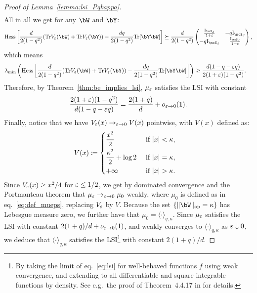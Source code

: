 \begin{proof}[Proof of Lemma~\ref{lemma:lsi_Pqkappa}]
\begin{align*}
    \end{align*}
    All in all we get for any $\bW$ and $\bY$:
    \begin{align*}
       \Hess \left[\frac{d}{2(1-q^2)} (\Tr V_\eps(\bW) + \Tr V_\eps(\bY)) - \frac{dq}{2(1-q^2)} \Tr[\bY \bW]\right]  
       \succeq \frac{d}{2(1-q^2)} 
       \begin{pmatrix}
         \frac{\Id_{\mcS_d}}{1+\eps} & - q \Id_{\mcS_d} \\ 
         -q \Id_{\mcS_d} & \frac{\Id_{\mcS_d}}{1+\eps}
       \end{pmatrix},
    \end{align*}
    which means
    \begin{align*}
        \lambda_\mathrm{min} \left(\Hess \left[\frac{d}{2(1-q^2)} (\Tr V_\eps(\bW) + \Tr V_\eps(\bY)) - \frac{dq}{2(1-q^2)} \Tr[\bY \bW]\right]\right) 
        &\geq \frac{d(1-q-\eps q)}{2(1+\eps)(1-q^2)}.
    \end{align*}
    Therefore, by Theorem~\ref{thm:be_implies_lsi}, $\mu_\varepsilon$ satisfies the LSI with constant 
    \begin{equation*}
        \frac{2(1+\varepsilon)(1-q^2)}{d(1-q-\varepsilon q)} =  \frac{2(1+q)}{d} + o_{\varepsilon \to 0}(1).
    \end{equation*}
    Finally, notice that
    we have $V_\varepsilon(x) \to_{\varepsilon \to 0} V(x)$ pointwise, with $V(x)$ defined as: 
    \begin{align*}
        V(x) &\coloneqq 
        \begin{dcases}
            \frac{x^2}{2} &\textrm{ if } |x| < \kappa, \\
            \frac{\kappa^2}{2} + \log 2 &\textrm{ if } |x| = \kappa, \\
            +\infty &\textrm{ if } |x| > \kappa.
        \end{dcases}
    \end{align*}
    Since $V_\varepsilon(x) \geq x^2/4$ for $\varepsilon \leq 1/2$, we get by dominated convergence and the Portmanteau theorem 
    that $\mu_\varepsilon \to_{\varepsilon\to 0} \mu_0$ weakly, where $\mu_0$ is defined as in eq.~\eqref{eq:def_mueps}, replacing $V_\varepsilon$ by $V$. 
    Because the set $\{\|\bW\|_\op = \kappa\}$ has Lebesgue measure zero, we further have that
    $\mu_0 = \langle \cdot \rangle_{q,\kappa}$.
    Since $\mu_\varepsilon$ satisfies the LSI with constant $2(1+q)/d + o_{\varepsilon \to 0}(1)$, and weakly converges to $\langle \cdot \rangle_{q,\kappa}$ as $\varepsilon \downarrow 0$, we deduce that $\langle \cdot \rangle_{q,\kappa}$ satisfies the LSI\footnote{
    By taking the limit of eq.~\eqref{eq:lsi} for well-behaved functions $f$ using weak convergence, and extending to all differentiable and square integrable functions by density. See e.g.\ the proof of Theorem~4.4.17 in \cite{anderson2010introduction} for details.}
    with constant $2(1+q)/d$.
\end{proof}

